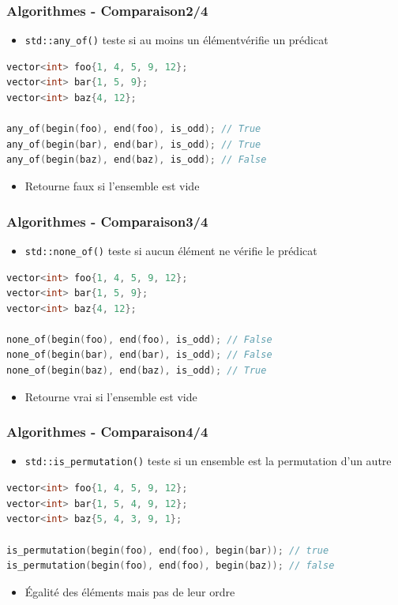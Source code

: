 \documentclass[C++.tex]{subfiles}
\begin{document}
\begin{frame}[fragile]
	\frametitle{Algorithmes - Comparaison\titlehfill{}2/4}
	\begin{itemize}
		\item \lstinline|std::any_of()| teste si au moins un élémentvérifie un prédicat
	\end{itemize}

	\begin{lstlisting}[language=C++]
vector<int> foo{1, 4, 5, 9, 12};
vector<int> bar{1, 5, 9};
vector<int> baz{4, 12};

any_of(begin(foo), end(foo), is_odd); // True
any_of(begin(bar), end(bar), is_odd); // True
any_of(begin(baz), end(baz), is_odd); // False\end{lstlisting}

	\begin{itemize}
		\item Retourne faux si l'ensemble est vide
	\end{itemize}
\end{frame}

\begin{frame}[fragile]
	\frametitle{Algorithmes - Comparaison\titlehfill{}3/4}
	\begin{itemize}
		\item \lstinline|std::none_of()| teste si aucun élément ne vérifie le prédicat
	\end{itemize}

	\begin{lstlisting}[language=C++]
vector<int> foo{1, 4, 5, 9, 12};
vector<int> bar{1, 5, 9};
vector<int> baz{4, 12};

none_of(begin(foo), end(foo), is_odd); // False
none_of(begin(bar), end(bar), is_odd); // False
none_of(begin(baz), end(baz), is_odd); // True\end{lstlisting}

	\begin{itemize}
		\item Retourne vrai si l'ensemble est vide
	\end{itemize}
\end{frame}

\begin{frame}[fragile]
	\frametitle{Algorithmes - Comparaison\titlehfill{}4/4}
	\begin{itemize}
		\item \lstinline|std::is_permutation()| teste si un ensemble est la permutation d'un autre
	\end{itemize}

	\begin{lstlisting}[language=C++]
vector<int> foo{1, 4, 5, 9, 12};
vector<int> bar{1, 5, 4, 9, 12};
vector<int> baz{5, 4, 3, 9, 1};

is_permutation(begin(foo), end(foo), begin(bar)); // true
is_permutation(begin(foo), end(foo), begin(baz)); // false\end{lstlisting}

	\begin{itemize}
		\item Égalité des éléments mais pas de leur ordre
	\end{itemize}
\end{frame}
\end{document}
